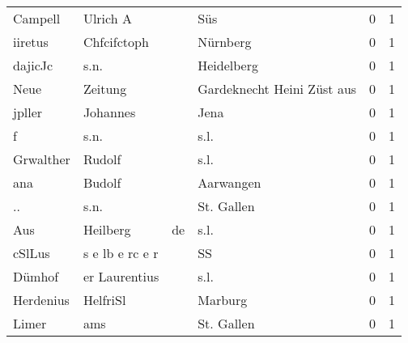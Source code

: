 \documentclass[10pt,a4paper,landscape]{article}
\begin{document}
\begin{longtable}{llllrr}
                  Campell &                           Ulrich A &             &                                         Süs &          0 &         1 \\
                  iiretus &                        Chfcifctoph &             &                                    Nürnberg &          0 &         1 \\
                  dajicJc &                               s.n. &             &                                  Heidelberg &          0 &         1 \\
                     Neue &                            Zeitung &             &                  Gardeknecht Heini Züst aus &          0 &         1 \\
                   jpller &                           Johannes &             &                                        Jena &          0 &         1 \\
                        f &                               s.n. &             &                                        s.l. &          0 &         1 \\
                Grwalther &                             Rudolf &             &                                        s.l. &          0 &         1 \\
                      ana &                             Budolf &             &                                   Aarwangen &          0 &         1 \\
                       .. &                               s.n. &             &                                  St. Gallen &          0 &         1 \\
                      Aus &                           Heilberg &          de &                                        s.l. &          0 &         1 \\
                   cSlLus &                    s e lb e rc e r &             &                                          SS &          0 &         1 \\
                   Dümhof &                      er Laurentius &             &                                        s.l. &          0 &         1 \\
                Herdenius &                           HelfriSl &             &                                     Marburg &          0 &         1 \\
                    Limer &                                ams &             &                                  St. Gallen &          0 &         1 \\

\end{longtable}
\end{document}
